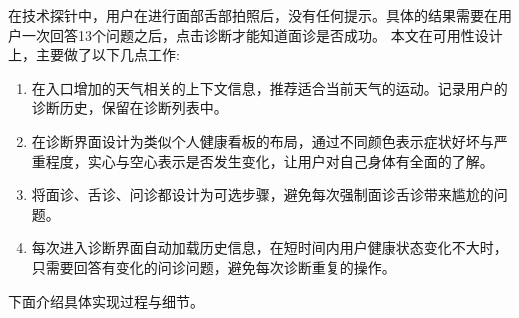 
在技术探针中，用户在进行面部舌部拍照后，没有任何提示。具体的结果需要在用户一次回答13个问题之后，点击诊断才能知道面诊是否成功。
本文在可用性设计上，主要做了以下几点工作:
\begin{enumerate}
    \item 在入口增加的天气相关的上下文信息，推荐适合当前天气的运动。记录用户的诊断历史，保留在诊断列表中。
    \item 在诊断界面设计为类似个人健康看板的布局，通过不同颜色表示症状好坏与严重程度，实心与空心表示是否发生变化，让用户对自己身体有全面的了解。
    \item 将面诊、舌诊、问诊都设计为可选步骤，避免每次强制面诊舌诊带来尴尬的问题。
    \item 每次进入诊断界面自动加载历史信息，在短时间内用户健康状态变化不大时，只需要回答有变化的问诊问题，避免每次诊断重复的操作。
\end{enumerate}

下面介绍具体实现过程与细节。


